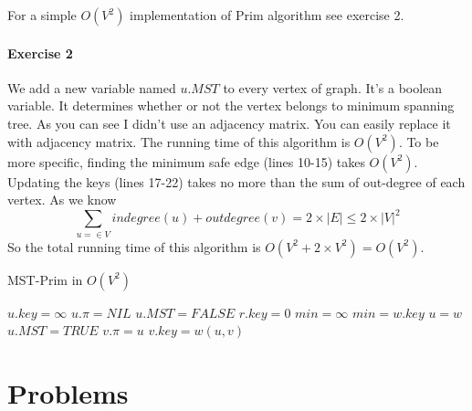 \documentclass{book}
\begin{document}
	For a simple $O(V^2)$ implementation of Prim algorithm see exercise 2.
	\paragraph{Exercise 2}
	We add a new variable named $u.MST$ to every vertex of graph. It's a boolean variable. It determines whether or not the vertex belongs to minimum spanning tree. As you can see I didn't use an adjacency matrix. You can easily replace it with adjacency matrix. The running time of this algorithm is $O(V^2)$. To be more specific, finding the minimum safe edge (lines 10-15) takes $O(V^2)$. Updating the keys (lines 17-22) takes no more than the sum of out-degree of each vertex. As we know 
	\begin{equation*}
		\sum_{u = \in V} {indegree(u) + outdegree(v)} = 2 \times |E| \le 2 \times |V|^2
	\end{equation*}
	So the total running time of this algorithm is $O(V^2 + 2 \times V^2) = O(V^2)$.
	
	\begin{algorithm}[h!]
		\caption{MST-Prim in $O(V^2)$}
		\begin{algorithmic}[1]
					\State $u.key = \infty$
					\State $u.\pi = NIL$
					\State $u.MST = FALSE$
				\EndFor
				\State $r.key = 0$
					\State $min = \infty$
							\State $min = w.key$
							\State $u = w$
						\EndIf
					\EndFor
					\State $u.MST = TRUE$
							\State $v.\pi = u$
							\State $v.key = w(u, v)$
						\EndIf
					\EndFor
				\EndFor
			\EndFunction
		\end{algorithmic}
	\end{algorithm}
	\FloatBarrier	
	\section{Problems}
\end{document}
